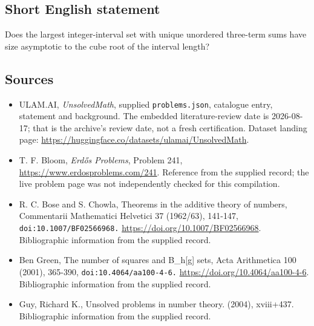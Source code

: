\documentclass[11pt,a4paper]{article}
\begin{document}
\subsection{Short English statement}

Does the largest integer-interval set with unique unordered three-term sums have size asymptotic to the cube root of the interval length?

\subsection{Sources}

{\small

\begin{itemize}

\item[\hypertarget{source:statement:1}{S1}] ULAM.AI, \emph{UnsolvedMath}, supplied \texttt{problems.json}, catalogue entry, statement and background. The embedded literature-review date is 2026-08-17; that is the archive’s review date, not a fresh certification. Dataset landing page: \url{https://huggingface.co/datasets/ulamai/UnsolvedMath}.

\item[\hypertarget{source:statement:2}{S2}] T. F. Bloom, \emph{Erdős Problems}, Problem 241, \url{https://www.erdosproblems.com/241}. Reference from the supplied record; the live problem page was not independently checked for this compilation.

\item[\hypertarget{source:statement:3}{S3}] R. C. Bose and S. Chowla, Theorems in the additive theory of numbers, Commentarii Mathematici Helvetici 37 (1962/63), 141-147, \nolinkurl{doi:10.1007/BF02566968.} \url{https://doi.org/10.1007/BF02566968}. Bibliographic information from the supplied record.

\item[\hypertarget{source:statement:4}{S4}] Ben Green, The number of squares and B\_h[g] sets, Acta Arithmetica 100 (2001), 365-390, \nolinkurl{doi:10.4064/aa100-4-6.} \url{https://doi.org/10.4064/aa100-4-6}. Bibliographic information from the supplied record.

\item[\hypertarget{source:statement:5}{S5}] Guy, Richard K., Unsolved problems in number theory. (2004), xviii+437. Bibliographic information from the supplied record.

\end{itemize}

}

\label{end:statement}
\end{document}
